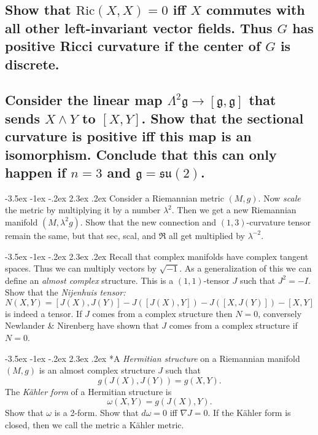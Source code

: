 \documentclass[10pt]{article}
\makeatletter
\renewcommand\section{\@startsection{section}{1}{\z@}%
                                  {-3.5ex \@plus -1ex \@minus -.2ex}%
                                  {2.3ex \@plus.2ex}%
                                  {\normalfont\large\bfseries}}
\newcommand{\ric}{\mbox{Ric}}
\makeatother
\begin{document}
\subsection{Show that $\ric(X,X) =0$ iff $X$ commutes with all other left-invariant vector fields. Thus $G$ has positive Ricci curvature if the center of $G$ is discrete.}
\subsection{Consider the linear map $\Lambda^2 \mathfrak{g} \to [\mathfrak{g} , \mathfrak{g}]$ that sends $X \wedge Y$ to $[X,Y]$. Show that the sectional curvature is positive iff this map is an isomorphism. Conclude that this can only happen if $n=3$ and $\mathfrak{g} = \mathfrak{su} (2)$.}


\section{Consider a Riemannian metric $(M,g)$. Now \emph{scale} the metric by multiplying it by a number $\lambda^2$. Then we get  a new Riemannian manifold $(M, \lambda^2 g)$. Show that the new connection and $(1,3)$-curvature tensor remain the same, but that sec, scal, and $\mathfrak{R}$ all get multiplied by $\lambda^{-2}$.}

\section{Recall that complex manifolds have complex tangent spaces. Thus we can multiply vectors by $\sqrt {-1}$. As a generalization of this we can define an \emph{almost complex} structure. This is a $(1,1)$-tensor $J$ such that $J^2 =-I$. Show that the \emph{Nijenhuis tensor:} $$N(X,Y) = [J(X), J(Y)] - J([J(X),Y])- J([X,J(Y)]) - [X,Y]$$ is indeed a tensor. If $J$ comes from a complex structure then $N=0$, conversely Newlander \& Nirenberg have shown that $J$ comes from a complex structure if $N=0$.}

\section*{A \emph{Hermitian  structure} on a Riemannian manifold $(M,g)$ is an almost complex structure $J$ such that $$g(J(X), J(Y)) = g(X,Y).$$ The \emph{K\"ahler form} of a Hermitian structure is $$\omega(X,Y) = g(J(X),Y).$$ Show that $\omega$ is a 2-form. Show that $d \omega =0$ iff $\nabla J=0$. If the K\"ahler form is closed, then we call the metric a K\"ahler metric.}
\end{document}
